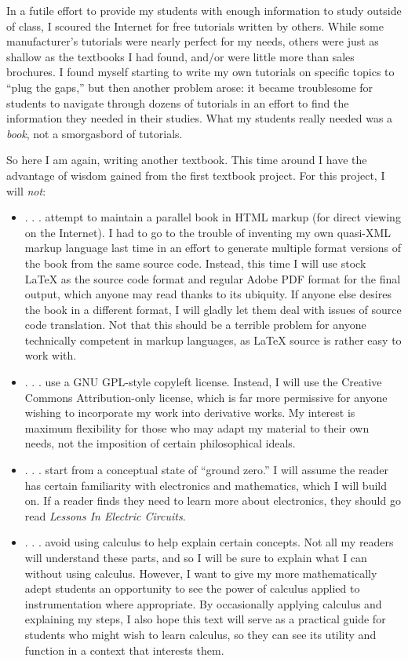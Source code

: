 In a futile effort to provide my students with enough information to study outside of class, I scoured the Internet for free tutorials written by others.  While some manufacturer's tutorials were nearly perfect for my needs, others were just as shallow as the textbooks I had found, and/or were little more than sales brochures.  I found myself starting to write my own tutorials on specific topics to ``plug the gaps,'' but then another problem arose: it became troublesome for students to navigate through dozens of tutorials in an effort to find the information they needed in their studies.  What my students really needed was a \textit{book}, not a smorgasbord of tutorials.

\vskip 10pt

So here I am again, writing another textbook.  This time around I have the advantage of wisdom gained from the first textbook project.  For this project, I will \textit{not}:

\begin{itemize}
\item . . . attempt to maintain a parallel book in HTML markup (for direct viewing on the Internet).  I had to go to the trouble of inventing my own quasi-XML markup language last time in an effort to generate multiple format versions of the book from the same source code.  Instead, this time I will use stock \LaTeX{} as the source code format and regular Adobe PDF format for the final output, which anyone may read thanks to its ubiquity.  If anyone else desires the book in a different format, I will gladly let them deal with issues of source code translation.  Not that this should be a terrible problem for anyone technically competent in markup languages, as \LaTeX{} source is rather easy to work with. 
\item . . . use a GNU GPL-style copyleft license.  Instead, I will use the Creative Commons Attribution-only license, which is far more permissive for anyone wishing to incorporate my work into derivative works.  My interest is maximum flexibility for those who may adapt my material to their own needs, not the imposition of certain philosophical ideals.
\item . . . start from a conceptual state of ``ground zero.''  I will assume the reader has certain familiarity with electronics and mathematics, which I will build on.  If a reader finds they need to learn more about electronics, they should go read \textit{Lessons In Electric Circuits}.
\item . . . avoid using calculus to help explain certain concepts.  Not all my readers will understand these parts, and so I will be sure to explain what I can without using calculus.  However, I want to give my more mathematically adept students an opportunity to see the power of calculus applied to instrumentation where appropriate.  By occasionally applying calculus and explaining my steps, I also hope this text will serve as a practical guide for students who might wish to learn calculus, so they can see its utility and function in a context that interests them.
\end{itemize}


